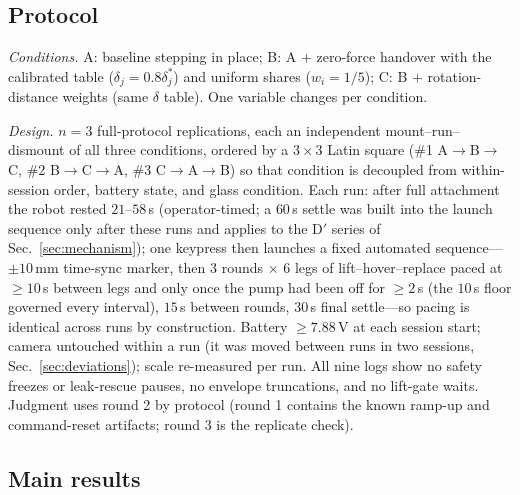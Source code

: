 \documentclass[journal]{IEEEtran}
\newcommand{\dstar}{\delta^{*}}
\begin{document}
\subsection{Protocol}
\label{sec:protocol}

\emph{Conditions.} A: baseline stepping in place; B: A $+$ zero-force
handover with the calibrated table ($\delta_j = 0.8\dstar_j$) and
uniform shares ($w_i = 1/5$); C: B $+$ rotation-distance weights (same
$\delta$ table). One variable changes per condition.

\emph{Design.} $n{=}3$ full-protocol replications, each an independent
mount--run--dismount of all three conditions, ordered by a $3\times3$
Latin square (\#1 A$\to$B$\to$C, \#2 B$\to$C$\to$A, \#3 C$\to$A$\to$B)
so that condition is decoupled from within-session order, battery
state, and glass condition. Each run: after full attachment the robot
rested $21$--$58$\,s (operator-timed; a $60$\,s settle was built into
the launch sequence only after these runs and applies to the D$'$
series of Sec.~\ref{sec:mechanism}); one keypress then launches a fixed
automated sequence---$\pm10$\,mm time-sync marker, then $3$ rounds
$\times$ $6$ legs of lift--hover--replace paced at $\ge10$\,s between
legs and only once the pump had been off for $\ge2$\,s (the $10$\,s
floor governed every interval), $15$\,s between rounds, $30$\,s final
settle---so pacing is identical across runs by construction. Battery
$\ge7.88$\,V at each session start; camera untouched within a run (it
was moved between runs in two sessions, Sec.~\ref{sec:deviations});
scale re-measured per run. All nine logs show no safety freezes or
leak-rescue pauses, no envelope truncations, and no lift-gate waits.
Judgment uses round 2 by protocol (round 1 contains the known ramp-up
and command-reset artifacts; round 3 is the replicate check).

\subsection{Main results}
\label{sec:results}
\end{document}
